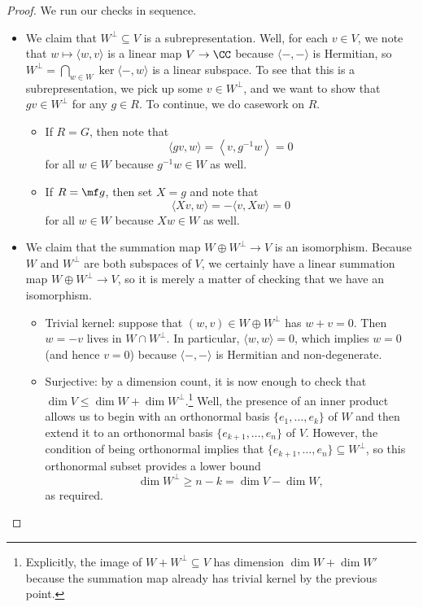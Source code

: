 \documentclass[../notes.tex]{subfiles}
\begin{document}
\begin{proof}
	We run our checks in sequence.
	\begin{itemize}
		\item We claim that $W^\perp\subseteq V$ is a subrepresentation. Well, for each $v\in V$, we note that $w\mapsto\langle w,v\rangle$ is a linear map $V\to\CC$ because $\langle-,-\rangle$ is Hermitian, so $W^\perp=\bigcap_{w\in W}\ker\langle-,w\rangle$ is a linear subspace. To see that this is a subrepresentation, we pick up some $v\in W^\perp$, and we want to show that $gv\in W^\perp$ for any $g\in R$. To continue, we do casework on $R$.
		\begin{itemize}
			\item If $R=G$, then note that
			\[\langle gv,w\rangle=\left\langle v,g^{-1}w\right\rangle=0\]
			for all $w\in W$ because $g^{-1}w\in W$ as well.
			\item If $R=\mf g$, then set $X=g$ and note that
			\[\langle Xv,w\rangle=-\langle v,Xw\rangle=0\]
			for all $w\in W$ because $Xw\in W$ as well.
		\end{itemize}

		\item We claim that the summation map $W\oplus W^\perp\to V$ is an isomorphism. Because $W$ and $W^\perp$ are both subspaces of $V$, we certainly have a linear summation map $W\oplus W^\perp\to V$, so it is merely a matter of checking that we have an isomorphism.
		\begin{itemize}
			\item Trivial kernel: suppose that $(w,v)\in W\oplus W^\perp$ has $w+v=0$. Then $w=-v$ lives in $W\cap W^\perp$. In particular, $\langle w,w\rangle=0$, which implies $w=0$ (and hence $v=0$) because $\langle-,-\rangle$ is Hermitian and non-degenerate.
			\item Surjective: by a dimension count, it is now enough to check that $\dim V\le\dim W+\dim W^\perp$.\footnote{Explicitly, the image of $W+W^\perp\subseteq V$ has dimension $\dim W+\dim W'$ because the summation map already has trivial kernel by the previous point.} Well, the presence of an inner product allows us to begin with an orthonormal basis $\{e_1,\ldots,e_k\}$ of $W$ and then extend it to an orthonormal basis $\{e_{k+1},\ldots,e_n\}$ of $V$. However, the condition of being orthonormal implies that $\{e_{k+1},\ldots,e_n\}\subseteq W^\perp$, so this orthonormal subset provides a lower bound
			\[\dim W^\perp\ge n-k=\dim V-\dim W,\]
			as required.
			\qedhere
		\end{itemize}
	\end{itemize}
\end{proof}
\end{document}
